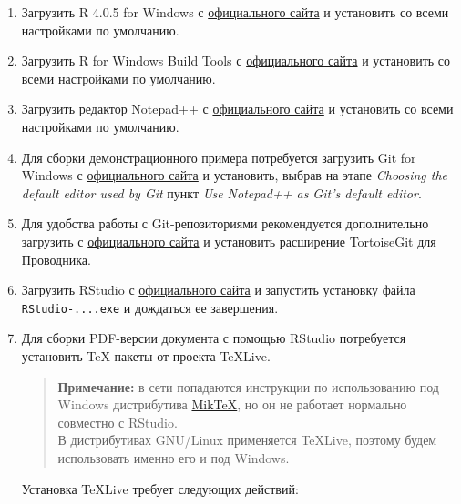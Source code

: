 \documentclass[
  a4paper,
]{book}
\theoremstyle{definition}
\theoremstyle{definition}
\theoremstyle{definition}
\theoremstyle{definition}
\theoremstyle{remark}
\begin{document}
\begin{enumerate}
\def\labelenumi{\arabic{enumi}.}
\item
  Загрузить R 4.0.5 for Windows с \href{https://cran.r-project.org/bin/windows/base/old/4.0.5/R-4.0.5-win.exe}{официального сайта} и установить со всеми настройками по умолчанию.
\item
  Загрузить R for Windows Build Tools с \href{https://cran.r-project.org/bin/windows/Rtools/rtools40-x86_64.exe}{официального сайта} и установить со всеми настройками по умолчанию.
\item
  Загрузить редактор Notepad++ с \href{https://notepad-plus-plus.org/download/}{официального сайта} и установить со всеми настройками по умолчанию.
\item
  Для сборки демонстрационного примера потребуется загрузить Git for Windows с \href{https://git-scm.com/download/win}{официального сайта} и установить, выбрав на этапе \emph{Choosing the default editor used by Git} пункт \emph{Use Notepad++ as Git's default editor}.
\item
  Для удобства работы с Git-репозиториями рекомендуется дополнительно загрузить с \href{https://tortoisegit.org/download/}{официального сайта} и установить расширение TortoiseGit для Проводника.
\item
  Загрузить RStudio с \href{https://www.rstudio.com/products/rstudio/download/\#download}{официального сайта} и запустить установку файла \texttt{RStudio-....exe} и дождаться ее завершения.
\item
  Для сборки PDF-версии документа с помощью RStudio потребуется установить TeX-пакеты от проекта TeXLive.

  \begin{quote}
  \textbf{Примечание:} в сети попадаются инструкции по использованию под Windows дистрибутива \href{https://miktex.org/howto/install-miktex}{MikTeX}, но он не работает нормально совместно с RStudio.\\
  В дистрибутивах GNU/Linux применяется TeXLive, поэтому будем использовать именно его и под Windows.
  \end{quote}

  Установка TeXLive требует следующих действий:


\end{enumerate}
\end{document}
